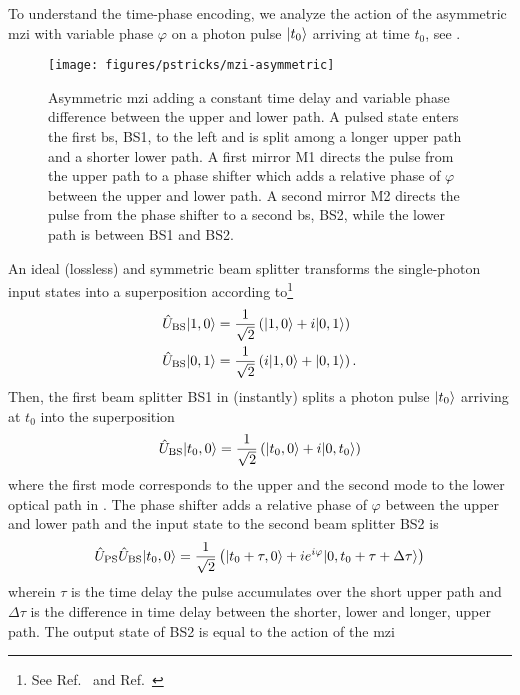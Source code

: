 To understand the time-phase encoding, we analyze the action of the asymmetric \gls{mzi} with variable phase $\varphi$ on a photon pulse $\lvert t_0\rangle$ arriving at time $t_0$, see .
\begin{figure}[htb]
    \centering
    \texttt{[image: figures/pstricks/mzi-asymmetric]}
     \caption{Asymmetric \gls{mzi} adding a constant time delay and variable phase difference between the upper and lower path. A pulsed state enters the first \gls{bs}, BS1, to the left and is split among a longer upper path and a shorter lower path. A first mirror M1 directs the pulse from the upper path to a phase shifter which adds a relative phase of $\varphi$ between the upper and lower path. A second mirror M2 directs the pulse from the phase shifter to a second \gls{bs}, BS2, while the lower path is between BS1 and BS2.}\label{fig:mzi_asymmetric}
\end{figure}
An ideal (lossless) and symmetric beam splitter transforms the single-photon input states into a superposition according to\footnote{See Ref.~\cite[p.~137]{Haroche2006} and Ref.~\cite[p.~143]{Gerry2005}}
\begin{align}
	\hat{U}_\text{BS}
	\lvert1,0\rangle
	&=
	\frac{1}{\sqrt{2}}
	\left(\lvert1,0\rangle+i\lvert0,1\rangle\right)
	\\
	\hat{U}_\text{BS}
	\lvert0,1\rangle
	&=
	\frac{1}{\sqrt{2}}
	\left(i\lvert1,0\rangle+\lvert0,1\rangle\right)
	.
\end{align}
Then, the first beam splitter BS1 in  (instantly) splits a photon pulse $\lvert t_0\rangle$ arriving at $t_0$ into the superposition
\begin{equation}
	\hat{U}_\text{BS}
	\lvert t_0,0\rangle
	=
	\frac{1}{\sqrt{2}}
	\left(\lvert t_0,0\rangle+i\lvert0,t_0\rangle\right)
\end{equation}
where the first mode corresponds to the upper and the second mode to the lower optical path in .
The phase shifter adds a relative phase of $\varphi$ between the upper and lower path and the input state to the second beam splitter BS2 is
\begin{equation}
	\hat{U}_\text{PS}
	\hat{U}_\text{BS}
	\lvert t_0,0\rangle
	=
	\frac{1}{\sqrt{2}}
	\left(
		\lvert t_0+\tau,0\rangle
		+
		ie^{i\varphi}
		\lvert0,t_0+\tau+\Delta\tau\rangle
	\right)
\end{equation}
wherein $\tau$ is the time delay the pulse accumulates over the short upper path and $\Delta\tau$ is the difference in time delay between the shorter, lower and longer, upper path.
The output state of BS2 is equal to the action of the \gls{mzi}
